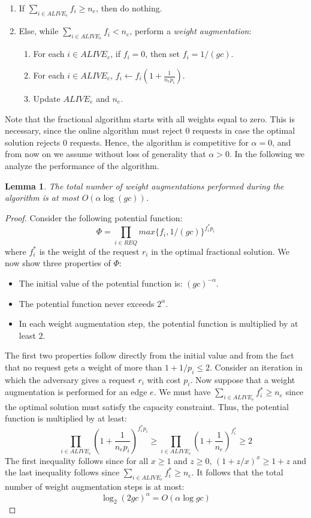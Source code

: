 \documentclass{sig-alternate}
\newtheorem{lemma}[theorem]{Lemma}
\begin{document}
\begin{enumerate}
    \item If $\sum_{i \in ALIVE_e} f_i \geq n_e$, then do
    nothing.
    \item Else, while $\sum_{i \in ALIVE_e} f_i < n_e$, perform a {\em weight augmentation}:
    \begin{enumerate}
        \item For each $i \in ALIVE_e$, if $f_i=0$, then set
        $f_i=1/(gc)$.\label{alg1}
        \item For each $i \in ALIVE_e$, $f_i \gets
        f_i(1+\frac{1}{n_e p_i})$.\label{alg2}
        \item Update $ALIVE_e$ and $n_e$.
    \end{enumerate}
\end{enumerate}

Note that the fractional algorithm starts with all weights equal
to zero. This is necessary, since the online algorithm must reject
$0$ requests in case the optimal solution rejects $0$ requests.
Hence, the algorithm is competitive for $\alpha = 0$, and from now
on we assume without loss of generality that $\alpha > 0$. In the
following we analyze the performance of the algorithm.

\begin{lemma}\label{frac_steps}
The total number of weight augmentations performed during the
algorithm is at most $O(\alpha \log (gc))$.
\end{lemma}

\begin{proof}
Consider the following potential function:
$$ \Phi = \prod_{i \in REQ} {max\{f_i,1/(gc)\}}^{f^*_i p_i}$$
where $f^*_i$ is the weight of the request $r_i$ in the optimal
fractional solution. We now show three properties of $\Phi$:
\begin{itemize}
    \item The initial value of the potential function is:
    $(gc)^{-\alpha}$.
    \item The potential function never exceeds $2^\alpha$.
    \item In each weight augmentation step, the potential function
    is multiplied by at least $2$.
\end{itemize}
The first two properties follow directly from the initial value
and from the fact that no request gets a weight of more than
$1+1/p_i \leq 2$. Consider an iteration in which the adversary
gives a request $r_i$ with cost $p_i$. Now suppose that a weight
augmentation is performed for an edge $e$. We must have $\sum_{i
\in ALIVE_e} f^*_i \geq n_e$ since the optimal solution must
satisfy the capacity constraint. Thus, the potential function is
multiplied by at least:
$$
\prod_{i \in ALIVE_e} \left(1+\frac{1}{n_e p_i}\right)^{f^*_i p_i}
\geq \prod_{i \in ALIVE_e} \left(1 + \frac{1}{n_e}\right)^{f^*_i}
\geq 2
$$
The first inequality follows since for all $x \geq 1$ and $z \geq
0$, $(1+z/x)^x \geq 1+z$ and the last inequality follows since
$\sum_{i \in ALIVE_e} f^*_i \geq n_e$. It follows that the total
number of weight augmentation steps is at most:
$$
\log_2 (2gc)^\alpha = O(\alpha \log gc )
$$
\end{proof}
\end{document}
